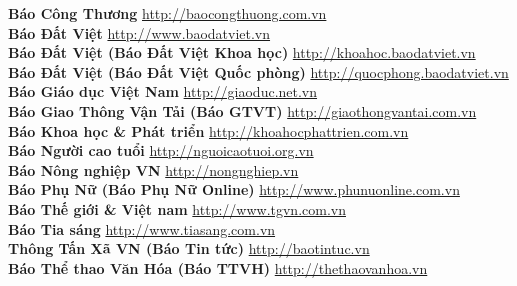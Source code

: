 \textbf{Báo Công Thương}  \hspace{0.5in} \href{http://baocongthuong.com.vn}{http://baocongthuong.com.vn} \\ 
\textbf{Báo Đất Việt}  \hspace{0.5in} \href{http://www.baodatviet.vn}{http://www.baodatviet.vn} \\ 
\textbf{Báo Đất Việt (Báo Đất Việt Khoa học)} \hspace{0.5in} \href{http://khoahoc.baodatviet.vn}{http://khoahoc.baodatviet.vn} \\ 
\textbf{Báo Đất Việt (Báo Đất Việt Quốc phòng)} \hspace{0.5in} \href{http://quocphong.baodatviet.vn}{http://quocphong.baodatviet.vn} \\ 
\textbf{Báo Giáo dục Việt Nam}  \hspace{0.5in} \href{http://giaoduc.net.vn}{http://giaoduc.net.vn} \\ 
\textbf{Báo Giao Thông Vận Tải (Báo GTVT)}  \hspace{0.5in} \href{http://giaothongvantai.com.vn}{http://giaothongvantai.com.vn} \\ 
\textbf{Báo Khoa học & Phát triển}  \hspace{0.5in} \href{http://khoahocphattrien.com.vn}{http://khoahocphattrien.com.vn} \\ 
\textbf{Báo Người cao tuổi}  \hspace{0.5in} \href{http://nguoicaotuoi.org.vn}{http://nguoicaotuoi.org.vn} \\ 
\textbf{Báo Nông nghiệp VN}  \hspace{0.5in} \href{http://nongnghiep.vn}{http://nongnghiep.vn} \\ 
\textbf{Báo Phụ Nữ (Báo Phụ Nữ Online)}  \hspace{0.5in} \href{http://www.phunuonline.com.vn}{http://www.phunuonline.com.vn} \\ 
\textbf{Báo Thế giới & Việt nam}  \hspace{0.5in} \href{http://www.tgvn.com.vn}{http://www.tgvn.com.vn} \\ 
\textbf{Báo Tia sáng}  \hspace{0.5in} \href{http://www.tiasang.com.vn}{http://www.tiasang.com.vn} \\ 
\textbf{Thông Tấn Xã VN (Báo Tin tức)}  \hspace{0.5in} \href{http://baotintuc.vn}{http://baotintuc.vn} \\ 
\textbf{Báo Thể thao Văn Hóa (Báo TTVH)}  \hspace{0.5in} \href{http://thethaovanhoa.vn}{http://thethaovanhoa.vn} \\ 
